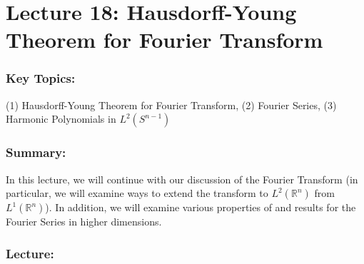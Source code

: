 \documentclass{article}
\begin{document}
\newpage 
\section{Lecture 18: Hausdorff-Young Theorem for Fourier Transform}
\subsubsection{Key Topics:} (1) Hausdorff-Young Theorem for Fourier Transform, (2) Fourier Series, (3) Harmonic Polynomials in $L^{2}(S^{n-1})$
\subsubsection{Summary:} In this lecture, we will continue with our discussion of the Fourier Transform (in particular, we will examine ways to extend the transform to $L^{2}(\mathbb{R}^{n})$ from $L^{1}(\mathbb{R}^{n})$). In addition, we will examine various properties of and results for the Fourier Series in higher dimensions. 

\subsubsection{Lecture:}
\end{document}
